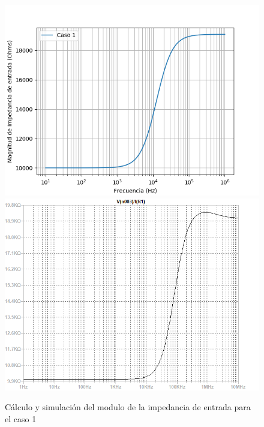 \begin{figure}[H]
\begin{centering}
\includegraphics[scale=0.5]{../Ex1/iA/Resources1a/zinpm1}\includegraphics[scale=0.4]{../Ex1/iA/Resources1a/zinpm1_sim}
\par\end{centering}
\caption{Cálculo y simulación del modulo de la impedancia de entrada para el
caso 1}
\end{figure}

